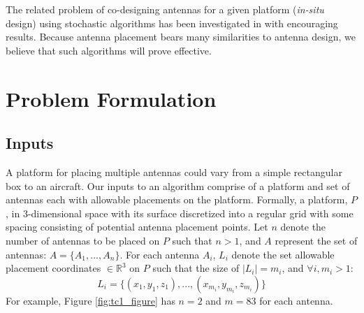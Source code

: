 \documentclass[conference]{IEEEtran}
\begin{document}
The related problem of co-designing antennas for a given platform ({\em in-situ} design) using stochastic algorithms has been investigated in \cite{linden2000wire} with encouraging results. Because antenna placement bears many similarities to antenna design, we believe that such algorithms will prove effective.

\section{Problem Formulation}
\label{sec:problem}
\subsection{Inputs}
\label{sec:inputs}
A platform for placing multiple antennas could vary from a simple rectangular box to an aircraft. Our inputs to an algorithm comprise of a platform and set of antennas each with allowable placements on the platform. Formally, a platform, $P$, in 3-dimensional space with its surface discretized into a regular grid with some spacing consisting of potential antenna placement points. Let $n$ denote the number of antennas to be placed on $P$ such that $n>1$, and $A$ represent the set of antennas: $A = \{A_1, ..., A_n\}$. For each antenna $A_i$, $L_i$ denote the set allowable placement coordinates $\in \mathbb R^3$ on $P$ such that the size of $\mid L_i \mid =m_i$, and $ \forall i, m_i>1$:
\[
L_i = \{(x_{1}, y_{1}, z_{1}), ..., (x_{m_i}, y_{m_i}, z_{m_i})\}
\]
For example, Figure \ref{fig:tc1_figure} has $n=2$ and $m=83$ for each antenna.
\end{document}
